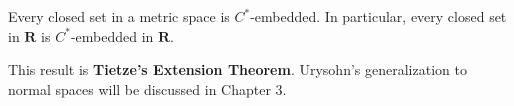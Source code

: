 Every closed set in a metric space is $C^*$-embedded. In particular, every closed set in $\mathbf{R}$ is $C^*$-embedded in $\mathbf{R}$.

This result is \textbf{Tietze's Extension Theorem}. Urysohn's generalization to normal spaces will be discussed in Chapter 3.
